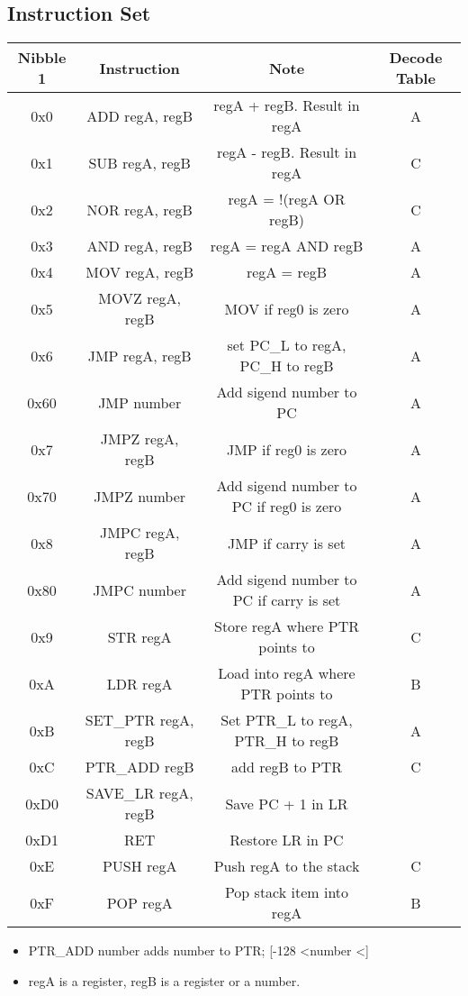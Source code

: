\documentclass[a4paper, 12pt]{article}
\begin{document}
\begin{center}
		\subsection{Instruction Set}
		\begin{tabular}{|c|c|c|c|}
			\hline
			Nibble 1 & Instruction & Note & Decode Table\\ \hline
			0x0 & ADD regA, regB & regA + regB. Result in regA & A\\ \hline
			0x1 & SUB regA, regB & regA - regB. Result in regA & C \\ \hline
			0x2 & NOR regA, regB & regA = !(regA OR regB) & C \\ \hline
			0x3 & AND regA, regB & regA = regA AND regB & A\\ \hline
			0x4 & MOV regA, regB & regA = regB & A\\ \hline
			0x5 & MOVZ regA, regB & MOV if reg0 is zero &  A\\ \hline
			0x6 & JMP regA, regB & set PC\_L to regA, PC\_H to regB & A\\ \hline
			0x60 & JMP number & Add sigend number to PC & A\\ \hline
			0x7 & JMPZ regA, regB & JMP if reg0 is zero & A\\ \hline
			0x70 & JMPZ number & Add sigend number to PC if reg0 is zero & A\\ \hline
			0x8 & JMPC regA, regB & JMP if carry is set & A\\ \hline
			0x80 & JMPC number & Add sigend number to PC if carry is set & A\\ \hline
			0x9 & STR regA & Store regA where PTR points to & C\\ \hline
			0xA & LDR regA & Load into regA where PTR points to & B\\ \hline
			0xB & SET\_PTR regA, regB & Set PTR\_L to regA, PTR\_H to regB & A\\ \hline
			0xC & PTR\_ADD regB & add regB to PTR & C\\ \hline
			0xD0 & SAVE\_LR regA, regB & Save PC + 1 in LR &   \\ \hline
			0xD1 & RET & Restore LR in PC &   \\ \hline
			0xE & PUSH regA & Push regA to the stack & C\\ \hline
			0xF & POP regA & Pop stack item into regA & B\\	\hline
		\end{tabular}	
		\begin{itemize}
			\item PTR\_ADD number adds number to PTR; [-128 \textless \space number \textless {}]
			\item regA is a register, regB is a register or a number.\newline
		\end{itemize}
	\end{center}
	\newpage
\end{document}

